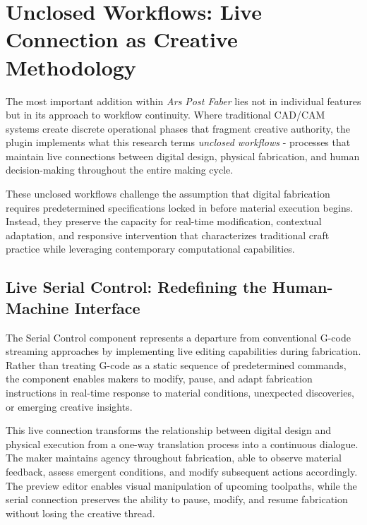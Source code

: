 \section{Unclosed Workflows: Live Connection as Creative Methodology}

The most important addition within \textit{Ars Post Faber} lies not in individual features but in its approach to workflow continuity. Where traditional CAD/CAM systems create discrete operational phases that fragment creative authority, the plugin implements what this research terms \textit{unclosed workflows} - processes that maintain live connections between digital design, physical fabrication, and human decision-making throughout the entire making cycle.

\vspace{0.5cm}

These unclosed workflows challenge the assumption that digital fabrication requires predetermined specifications locked in before material execution begins. Instead, they preserve the capacity for real-time modification, contextual adaptation, and responsive intervention that characterizes traditional craft practice while leveraging contemporary computational capabilities.

\subsection{Live Serial Control: Redefining the Human-Machine Interface}

The Serial Control component represents a departure from conventional G-code streaming approaches by implementing live editing capabilities during fabrication. Rather than treating G-code as a static sequence of predetermined commands, the component enables makers to modify, pause, and adapt fabrication instructions in real-time response to material conditions, unexpected discoveries, or emerging creative insights.

\vspace{0.5cm}

This live connection transforms the relationship between digital design and physical execution from a one-way translation process into a continuous dialogue. The maker maintains agency throughout fabrication, able to observe material feedback, assess emergent conditions, and modify subsequent actions accordingly. The preview editor enables visual manipulation of upcoming toolpaths, while the serial connection preserves the ability to pause, modify, and resume fabrication without losing the creative thread.

